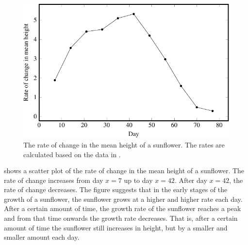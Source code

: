 \documentclass[a4paper,oneside,12pt]{article}
\begin{document}
\begin{problem}
{\begin{solution}
\begin{figure}[!htbp]
\centering
\includegraphics[scale=1.1]{image/12/sunflower-delta.pdf}
\caption{%
  The rate of change in the mean height of a sunflower.  The rates are
  calculated based on the data in .
}
\label{fig:logarithm:logistic_sunflower_delta}
\end{figure}

 shows a scatter plot
of the rate of change in the mean height of a sunflower.  The rate of
change increases from day $x = 7$ up to day $x = 42$.  After day
$x = 42$, the rate of change decreases.  The figure suggests that in
the early stages of the growth of a sunflower, the sunflower grows at
a higher and higher rate each day.  After a certain amount of time,
the growth rate of the sunflower reaches a peak and from that time
onwards the growth rate decreases.  That is, after a certain amount of
time the sunflower still increases in height, but by a smaller and
smaller amount each day.


\end{solution}}
\end{problem}
\end{document}
